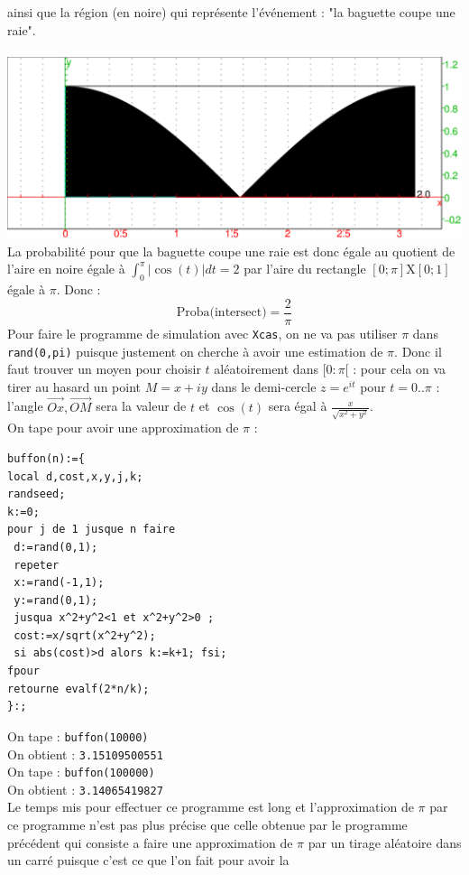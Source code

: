 \documentclass[a4paper,11pt]{book}
\begin{document}
ainsi que la r\'egion (en noire) qui repr\'esente l'\'ev\'enement :
"la baguette coupe une raie".\\
\ \\
\includegraphics[width=\textwidth]{buffon1}\\
La probabilit\'e pour que la baguette coupe une raie est donc \'egale au 
quotient de l'aire en noire \'egale \`a $\int_0^\pi|\cos(t)| dt=2$ par l'aire 
du rectangle $[0;\pi]$X$[0;1]$ \'egale \`a $\pi$. Donc :
 $$\mbox{Proba(intersect)}=\frac{2}{\pi}$$
Pour faire le programme de simulation avec {\tt Xcas}, on ne va pas utiliser 
$\pi$ dans {\tt rand(0,pi)} puisque justement on cherche \`a avoir une 
estimation de $\pi$. Donc il faut trouver un moyen pour choisir $t$ 
al\'eatoirement dans $[0:\pi[$ : pour cela on va tirer au hasard un point 
$M=x+iy$ dans le demi-cercle $z=e^{it}$ pour $t=0..\pi$ : l'angle 
$\overrightarrow{Ox},\overrightarrow{OM}$ sera la valeur de $t$ et $\cos(t)$ 
sera \'egal \`a $\displaystyle \frac{x}{\sqrt{x^2+y^2}}$.\\
On tape pour avoir une approximation de $\pi$ :
\begin{verbatim}
buffon(n):={
local d,cost,x,y,j,k;
randseed;
k:=0;
pour j de 1 jusque n faire
 d:=rand(0,1);
 repeter
 x:=rand(-1,1);
 y:=rand(0,1);
 jusqua x^2+y^2<1 et x^2+y^2>0 ;
 cost:=x/sqrt(x^2+y^2);
 si abs(cost)>d alors k:=k+1; fsi;
fpour
retourne evalf(2*n/k);
}:;
\end{verbatim}
On tape :
{\tt buffon(10000)}\\
On obtient :
{\tt 3.15109500551}\\
On tape :
{\tt buffon(100000)}\\
On obtient :
{\tt 3.14065419827}\\
Le temps mis pour effectuer ce programme est long et l'approximation de $\pi$ 
par ce programme n'est pas plus pr\'ecise que celle obtenue par le
programme pr\'ec\'edent qui consiste a faire une approximation de $\pi$ par un 
tirage al\'eatoire dans un carr\'e puisque c'est ce que l'on fait pour avoir la 
\end{document}
